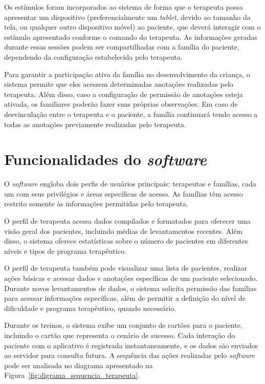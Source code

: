 Os estímulos foram incorporados ao sistema de forma que o terapeuta possa apresentar um dispositivo 
(preferencialmente um \textit{tablet}, devido ao tamanho da tela, ou qualquer outro dispositivo móvel) ao paciente, 
que deverá interagir com o estímulo apresentado conforme o comando do terapeuta. 
As informações geradas durante essas sessões podem ser compartilhadas com a família do paciente, 
dependendo da configuração estabelecida pelo terapeuta.

Para garantir a participação ativa da família no desenvolvimento da criança, 
o sistema permite que eles acessem determinadas anotações realizadas pelo terapeuta. 
Além disso, caso a configuração de permissão de anotações esteja ativada, 
os familiares poderão fazer suas próprias observações. 
Em caso de desvinculação entre o terapeuta e o paciente, 
a família continuará tendo acesso a todas as anotações previamente realizadas pelo terapeuta.

\section{Funcionalidades do \textit{software}} 

O \textit{software} engloba dois perfis de usuários principais: 
terapeutas e famílias, cada um com seus privilégios e áreas específicas de acesso. 
As famílias têm acesso restrito somente às informações permitidas pelo terapeuta.

O perfil de terapeuta acessa dados compilados e formatados para oferecer uma visão geral dos pacientes, 
incluindo médias de levantamentos recentes. Além disso, 
o sistema oferece estatísticas sobre o número de pacientes em diferentes níveis e tipos de programa terapêutico.

O perfil de terapeuta também pode visualizar uma lista de pacientes, 
realizar ações básicas e acessar dados e anotações específicas de um paciente selecionado. 
Durante novos levantamentos de dados, o sistema solicita permissão das famílias para acessar informações específicas, 
além de permitir a definição do nível de dificuldade e programa terapêutico, quando necessário.

Durante os treinos, o sistema exibe um conjunto de cartões para o paciente, 
incluindo o cartão que representa o cenário de sucesso. 
Cada interação do paciente com o aplicativo é registrada instantaneamente, 
e os dados são enviados ao servidor para consulta futura. 
A sequência das ações realizadas pelo \textit{software} pode ser analisada no diagrama 
apresentado na Figura~\ref{fig:digrama_sequencia_terapeuta}.

